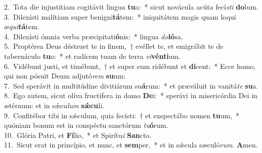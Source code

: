 {2.~}Tota die injustítiam cogitávit lingua \textbf{tu}a:~* sicut novácula acúta fecí\textit{sti} \textbf{do}lum.\\
{3.~}Dilexísti malítiam super benigni\textbf{tá}tem:~* iniquitátem magis quam loqui æ\textit{qui}\textbf{tá}tem.\\
{4.~}Dilexísti ómnia verba præcipitati\textbf{ó}nis:~* lingua \textit{do}\textbf{ló}sa.\\
{5.~}Proptérea Deus déstruet te in finem,~† evéllet te, et emigrábit te de tabernáculo \textbf{tu}o:~* et radícem tuam de terra \textit{vi}\textbf{vén}\textbf{ti}um.\\
{6.~}Vidébunt justi, et timébunt,~† et super eum ridébunt et \textbf{di}cent:~* Ecce homo, qui non pósuit Deum adjutó\textit{rem} \textbf{su}um:\\
{7.~}Sed sperávit in multitúdine divitiárum su\textbf{á}rum:~* et præváluit in vanitá\textit{te} \textbf{su}a.\\
{8.~}Ego autem, sicut olíva fructífera in domo \textbf{De}i:~* sperávi in misericórdia Dei in ætérnum: et in sǽcu\textit{lum} \textbf{sǽ}\textbf{cu}li.\\
{9.~}Confitébor tibi in sǽculum, quia fecísti:~† et exspectábo nomen \textbf{tu}um,~* quóniam bonum est in conspéctu sanctórum \textit{tu}\textbf{ó}rum.\\
{10.~}Glória Patri, et \textbf{Fí}lio,~* et Spirítu\textit{i} \textbf{San}cto.\\
{11.~}Sicut erat in princípio, et nunc, et \textbf{sem}per,~* et in sǽcula sæculó\textit{rum}. \textbf{A}men.\\
